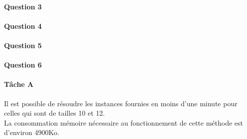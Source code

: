 \paragraph{Question 3}
\paragraph{Question 4}
\paragraph{Question 5}
\paragraph{Question 6}
\paragraph{Tâche A}
Il est possible de résoudre les instances fournies en moins d'une minute pour celles qui sont de tailles 10 et 12.\\
La consommation mémoire nécessaire au fonctionnement de cette méthode est d'environ 4900Ko.

